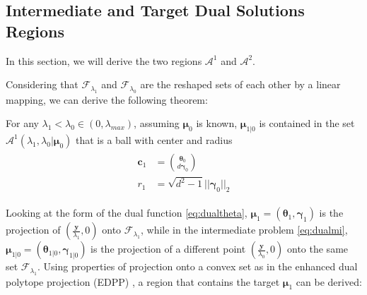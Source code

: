 \subsection{Intermediate and Target Dual Solutions Regions}

In this section, we will derive the two regions $\mathcal{A}^1$ and $\mathcal{A}^2$. 

Considering that $\mathcal{F}_{\lambda_1}$ and $\mathcal{F}_{\lambda_0}$ are the reshaped sets of each other by a linear mapping, we can derive the following theorem:

\begin{theorem}
    \label{thm:1.1}
    For any $\lambda_1<\lambda_{0}\in (0,\lambda_{max})$, assuming $\boldsymbol\mu_0$ is known, $\boldsymbol\mu_{1|0}$ is contained in the set $\mathcal{A}^1(\lambda_1,\lambda_0|\boldsymbol\mu_0)$ that is a ball with center and radius
    \begin{gather}
        \begin{aligned}
            \boldsymbol c_1&=\binom{\boldsymbol\theta_0}{d\boldsymbol\gamma_0}\\
            r_1&=\sqrt{d^2-1}||\boldsymbol\gamma_0||_2
        \end{aligned}
    \end{gather}
\end{theorem}

Looking at the form of the dual function \eqref{eq:dualtheta}, $\boldsymbol\mu_1=(\boldsymbol\theta_1,\boldsymbol\gamma_1)$ is the projection of $(\frac{\boldsymbol y}{\lambda_1},0)$ onto $\mathcal{F}_{\lambda_1}$, while in the intermediate problem \eqref{eq:dualmi}, $\boldsymbol\mu_{1|0}=(\boldsymbol\theta_{1|0},\boldsymbol\gamma_{1|0})$ is the projection of a different point $(\frac{\boldsymbol y}{\lambda_0},0)$ onto the same set $\mathcal{F}_{\lambda_1}$. Using properties of projection onto a convex set as in the enhanced dual polytope projection (EDPP) \citep{wang2013lasso}, a region that contains the target $\boldsymbol\mu_1$ can be derived:

